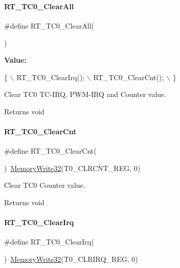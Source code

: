 \paragraph{\texorpdfstring{R\+T\+\_\+\+T\+C0\+\_\+\+Clear\+All}{RT\_TC0\_ClearAll}}
{\footnotesize\ttfamily \#define R\+T\+\_\+\+T\+C0\+\_\+\+Clear\+All(\begin{DoxyParamCaption}{ }\end{DoxyParamCaption})}

{\bfseries Value\+:}
\begin{DoxyCode}
\{                      \(\backslash\)
        RT\_TC0\_ClearIrq(); \(\backslash\)
        RT\_TC0\_ClearCnt(); \(\backslash\)
    \}
\end{DoxyCode}


Clear T\+C0 T\+C-\/\+I\+RQ, P\+W\+M-\/\+I\+RQ and Counter value. 

\begin{DoxyReturn}{Returns}
void 
\end{DoxyReturn}
\mbox{\label{a00041_a17c2c2161dfc43f81e4e887a0d2b62ee}} 
\paragraph{\texorpdfstring{R\+T\+\_\+\+T\+C0\+\_\+\+Clear\+Cnt}{RT\_TC0\_ClearCnt}}
{\footnotesize\ttfamily \#define R\+T\+\_\+\+T\+C0\+\_\+\+Clear\+Cnt(\begin{DoxyParamCaption}{ }\end{DoxyParamCaption})~\mbox{\hyperlink{a00020_ad9953f631a539cfaa35baf94f878b3ec}{Memory\+Write32}}(T0\+\_\+\+C\+L\+R\+C\+N\+T\+\_\+\+R\+EG, 0)}



Clear T\+C0 Counter value. 

\begin{DoxyReturn}{Returns}
void 
\end{DoxyReturn}
\mbox{\label{a00041_a8758649b0f3c3401f75970ddeab0a8d9}} 
\paragraph{\texorpdfstring{R\+T\+\_\+\+T\+C0\+\_\+\+Clear\+Irq}{RT\_TC0\_ClearIrq}}
{\footnotesize\ttfamily \#define R\+T\+\_\+\+T\+C0\+\_\+\+Clear\+Irq(\begin{DoxyParamCaption}{ }\end{DoxyParamCaption})~\mbox{\hyperlink{a00020_ad9953f631a539cfaa35baf94f878b3ec}{Memory\+Write32}}(T0\+\_\+\+C\+L\+R\+I\+R\+Q\+\_\+\+R\+EG, 0)}



